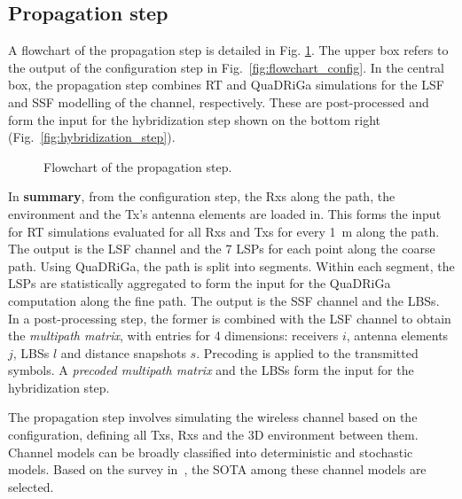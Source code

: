 \documentclass{IEEEtran}
\begin{document}
\subsection{Propagation step}
A flowchart of the propagation step is detailed in Fig. \ref{fig:flowchart_prop}. The upper box refers to the output of the configuration step in Fig.~\ref{fig:flowchart_config}. In the central box, the propagation step combines \gls{RT} and \gls{QuaDRiGa} simulations for the \gls{LSF} and \gls{SSF} modelling of the channel, respectively. These are post-processed and form the input for the hybridization step shown on the bottom right (Fig.~\ref{fig:hybridization_step}).
\begin{figure}[h]
    \centering
    
    \caption{Flowchart of the propagation step.}
    \label{fig:flowchart_prop}
\end{figure}

In \textbf{summary}, from the configuration step, the Rxs along the path, the environment and the Tx's antenna elements are loaded in. This forms the input for \gls{RT} simulations evaluated for all Rxs and Txs for every 1~m along the path. The output is the \gls{LSF} channel and the 7 \glspl{LSP} for each point along the coarse path. Using \gls{QuaDRiGa}, the path is split into segments. Within each segment, the \glspl{LSP} are statistically aggregated to form the input for the \gls{QuaDRiGa} computation along the fine path. The output is the \gls{SSF} channel and the \glspl{LBS}. In a post-processing step, the former is combined with the \gls{LSF} channel to obtain the \textit{multipath matrix}, with entries for 4 dimensions: receivers $i$, antenna elements $j$, \glspl{LBS} $l$ and distance snapshots $s$. Precoding is applied to the transmitted symbols. A \textit{precoded multipath matrix} and the \glspl{LBS} form the input for the hybridization step.

The propagation step involves simulating the wireless channel based on the configuration, defining all Txs, Rxs and the 3D environment between them. Channel models can be broadly classified into deterministic and stochastic models. Based on the survey in~\cite{channelgensurver}, the \gls{SOTA} among these channel models are selected.
\end{document}
